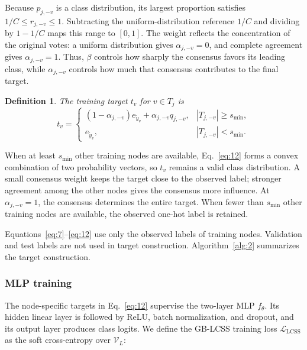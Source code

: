 \documentclass[10pt,letterpaper,nopreprintline]{elsarticle}
\theoremstyle{plain}
\newtheorem{definition}{Definition}
\begin{document}
Because \(p_{j,-v}\) is a class distribution, its largest proportion satisfies \(1/C\leq r_{j,-v}\leq1\). Subtracting the uniform-distribution reference \(1/C\) and dividing by \(1-1/C\) maps this range to \([0,1]\). The weight reflects the concentration of the original votes: a uniform distribution gives \(\alpha_{j,-v}=0\), and complete agreement gives \(\alpha_{j,-v}=1\). Thus, \(\beta\) controls how sharply the consensus favors its leading class, while \(\alpha_{j,-v}\) controls how much that consensus contributes to the final target.

\Needspace{64pt}

\begin{definition}
The training target \(t_{v}\) for \(v \in T_{j}\) is
\begin{equation}\label{eq:12}
t_{v} = \begin{cases}
(1 - \alpha_{j, - v})e_{{\widetilde{y}}_{v}} + \alpha_{j, - v}q_{j, - v}, & |T_{j, - v}| \geq s_{\min}, \\
e_{{\widetilde{y}}_{v}}, & |T_{j, - v}| < s_{\min}.
\end{cases}
\end{equation}
\end{definition}

When at least \(s_{\min}\) other training nodes are available, Eq.~\eqref{eq:12} forms a convex combination of two probability vectors, so \(t_v\) remains a valid class distribution. A small consensus weight keeps the target close to the observed label; stronger agreement among the other nodes gives the consensus more influence. At \(\alpha_{j,-v}=1\), the consensus determines the entire target. When fewer than \(s_{\min}\) other training nodes are available, the observed one-hot label is retained.

Equations~\eqref{eq:7}--\eqref{eq:12} use only the observed labels of training nodes. Validation and test labels are not used in target construction. Algorithm~\ref{alg:2} summarizes the target construction.



\subsubsection{MLP training}\label{sec:3.3.3}

The node-specific targets in Eq.~\eqref{eq:12} supervise the two-layer MLP \(f_{\theta}\). Its hidden linear layer is followed by ReLU, batch normalization, and dropout, and its output layer produces class logits. We define the GB-LCSS training loss \(\mathcal{L}_{\mathrm{LCSS}}\) as the soft cross-entropy over \(\mathcal{V}_{L}\):
\end{document}
